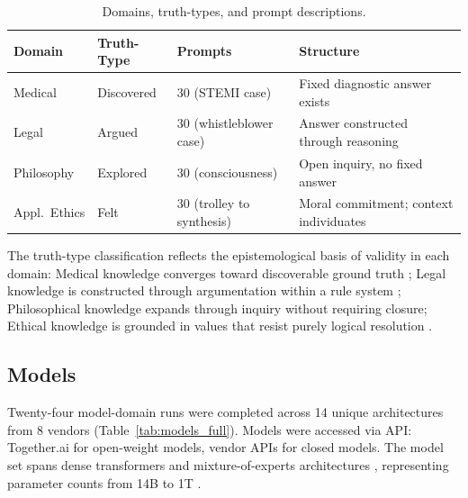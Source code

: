 \documentclass[11pt,a4paper]{article}
\begin{document}
\begin{table}[H]
\centering
\caption{Domains, truth-types, and prompt descriptions.}
\label{tab:domains}
\begin{tabular}{llll}
\toprule
\textbf{Domain} & \textbf{Truth-Type} & \textbf{Prompts} & \textbf{Structure} \\
\midrule
Medical     & Discovered & 30 (STEMI case)          & Fixed diagnostic answer exists \\
Legal       & Argued     & 30 (whistleblower case)  & Answer constructed through reasoning \\
Philosophy  & Explored   & 30 (consciousness)       & Open inquiry, no fixed answer \\
Appl.\ Ethics & Felt     & 30 (trolley to synthesis) & Moral commitment; context individuates \\
\bottomrule
\end{tabular}
\end{table}

The truth-type classification reflects the epistemological basis of validity in each
domain: Medical knowledge converges toward discoverable ground truth
\citep{thirunavukarasu2023,singhal2025expert,ayers2023physician,nori2023}; Legal knowledge
is constructed through argumentation within a rule system
\citep{guha2023,nay2024tax,dahl2024hallucinations,choi2022lawschool}; Philosophical
knowledge expands through inquiry without requiring closure; Ethical knowledge is grounded
in values that resist purely logical resolution
\citep{shanahan2024,fierro2024,bender2021,ji2024moralbench,suzgun2024belief,paseri2025epistemological}.

\subsection{Models}

Twenty-four model-domain runs were completed across 14 unique architectures from 8
vendors (Table~\ref{tab:models_full}). Models were accessed via API: Together.ai for
open-weight models, vendor APIs for closed models. The model set spans dense transformers
\citep{vaswani2017} and mixture-of-experts architectures \citep{fedus2022switch},
representing parameter counts from 14B to 1T \citep{hoffmann2022,wei2022emergent,kaplan2020}.
\end{document}
